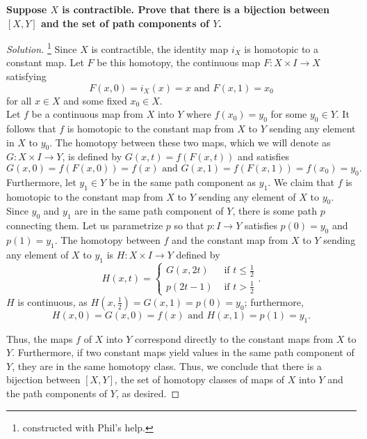 \documentclass[11pt]{article}
\newenvironment{solution}
  {\renewcommand\qedsymbol{$\blacksquare$}\begin{proof}[Solution]}
  {\end{proof}}
\begin{document}
\newpage

\textbf{Suppose $X$ is contractible. Prove that there is a bijection between $[X, Y]$ and the set of path components of $Y$.}

\begin{solution}\footnote{constructed with Phil's help.}
Since $X$ is contractible, the identity map $i_X$ is homotopic to a constant map. Let $F$ be this homotopy, the continuous map $F\colon X \times I \rightarrow  X$ satisfying
\[
    F(x, 0) = i_X(x) = x \text{ and } F(x, 1) = x_0
\]
for all $x \in X$ and some fixed $x_0 \in X$. \\

Let $f$ be a continuous map from $X$ into $Y$ where $f(x_0) = y_0$ for some $y_0 \in Y$. It follows that $f$ is homotopic to the constant map from $X$ to $Y$ sending any element in $X$ to $y_0$. 
The homotopy between these two maps, which we will denote as $G\colon X \times I \rightarrow Y$, is defined by $G(x, t) = f(F(x, t))$ and satisfies
\[
    G(x, 0) = f(F(x, 0)) = f(x) \text{ and } G(x, 1) = f(F(x, 1)) = f(x_0) = y_0.
\]
Furthermore, let $y_1 \in Y$ be in the same path component as $y_1$. We claim that $f$ is homotopic to the constant map from $X$ to $Y$ sending any element of $X$ to $y_0$. 
Since $y_0$ and $y_1$ are in the same path component of $Y$, there is some path $p$ connecting them. Let us parametrize $p$ so that $p\colon I \rightarrow Y$ satisfies $p(0) = y_0$ and $p(1) = y_1$. 
The homotopy between $f$ and the constant map from $X$ to $Y$ sending any element of $X$ to $y_1$ is $H\colon X \times I \rightarrow Y$ defined by
\[
    H(x, t) = \begin{cases}
        G(x, 2t) &\text{ if $t \leq \frac{1}{2}$}  \\
        p(2t - 1) &\text{ if $t > \frac{1}{2}$}
    \end{cases}.
\]
$H$ is continuous, as $H\left( x, \frac{1}{2} \right) = G(x, 1) = p(0) = y_0$; furthermore, 
\[
    H(x, 0) = G(x, 0) = f(x) \text{ and } H(x, 1) = p(1) = y_1.
\]

Thus, the maps $f$ of $X$ into $Y$ correspond directly to the constant maps from $X$ to $Y$. Furthermore, if two constant maps 
yield values in the same path component of $Y$, they are in the same homotopy class. Thus, we conclude that there is a bijection between $[X, Y]$, the set of
homotopy classes of maps of $X$ into $Y$ and the path components of $Y$, as desired.
\end{solution}
\end{document}
